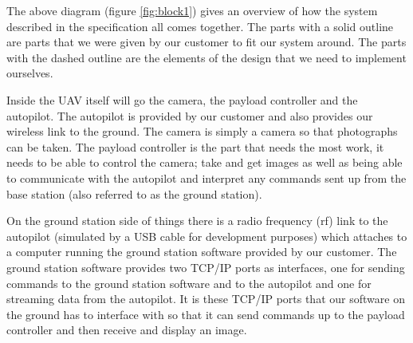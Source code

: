 The above diagram (figure \ref{fig:block1}) gives an overview of how the system described in the specification all comes together. The parts with a solid outline are parts that we were given by our customer to fit our system around. The parts with the dashed outline are the elements of the design that we need to implement ourselves.

Inside the UAV itself will go the camera, the payload controller and the autopilot. The autopilot is provided by our customer and also provides our wireless link to the ground. The camera is simply a camera so that photographs can be taken. The payload controller is the part that needs the most work, it needs to be able to control the camera; take and get images as well as being able to communicate with the autopilot and interpret any commands sent up from the base station (also referred to as the ground station).

On the ground station side of things there is a radio frequency (rf) link to the autopilot (simulated by a USB cable for development purposes) which attaches to a computer running the ground station software provided by our customer. The ground station software provides two TCP/IP ports as interfaces, one for sending commands to the ground station software and to the autopilot and one for streaming data from the autopilot. It is these TCP/IP ports that our software on the ground has to interface with so that it can send commands up to the payload controller and then receive and display an image.
